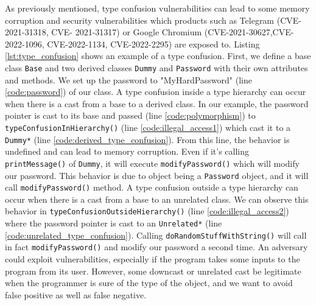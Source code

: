 \documentclass[a4paper,11pt,oneside]{report}
\begin{document}
As previously mentioned, type confusion vulnerabilities can lead to some memory
corruption and security vulnerabilities which products such as Telegram
(CVE-2021-31318, CVE- 2021-31317) or Google Chromium
(CVE-2021-30627,CVE-2022-1096, CVE-2022-1134, CVE-2022-2295) are exposed to.
Listing \autoref{lst:type_confusion} shows an example of a type confusion.
First, we define a base class \texttt{Base} and two derived classes
\texttt{Dummy} and \texttt{Password} with their own attributes and methods. We
set up the password to "MyHardPassword" (line \ref{code:password}) of our
class.  A type confusion inside a type hierarchy can occur when there is a
cast from a base to a derived class.  In our example, the password pointer is
cast to its base and passed (line \ref{code:polymorphism}) to
\texttt{typeConfusionInHierarchy()} (line \ref{code:illegal_access1}) which cast
it to a \texttt{Dummy*} (line \ref{code:derived_type_confusion}).  From this
line, the behavior is undefined and can lead to memory corruption. Even if it's
calling \texttt{printMessage()} of \texttt{Dummy}, it will execute
\texttt{modifyPassword()} which will modify our password.  This behavior is due
to object being a \texttt{Password} object, and it will call
\texttt{modifyPassword()} method.  A type confusion outside a type hierarchy
can occur when there is a cast from a base to an unrelated class.  We can
observe this behavior in \texttt{typeConfusionOutsideHierarchy()} (line
\ref{code:illegal_access2})  where the password pointer is cast to an
\texttt{Unrelated*} (line \ref{code:unrelated_type_confusion}).  Calling
\texttt{doRandomStuffWithString()} will call in fact \texttt{modifyPassword()}
and modify our password a second time.  An adversary could exploit
vulnerabilities, especially if the program takes some inputs to the program
from its user.  However, some downcast or unrelated cast be legitimate when the
programmer is sure of the type of the object, and we want to avoid false
positive as well as false negative.
\end{document}
